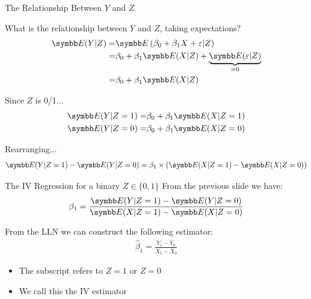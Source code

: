 \documentclass[aspectratio=169,11pt]{beamer}
\begin{document}
\begin{frame}{The Relationship Between $Y$ and $Z$}

What is the relationship between $Y$ and $Z$, taking expectations?
\begin{align*}
		\E(Y|Z) =& \E\left(\beta_0 + \beta_1 X + \varepsilon| Z\right)\\
			   =& \beta_0 + \beta_1 \E(X|Z) + \underbrace{\E(\varepsilon|Z)}_{=0}\\
			   =&\beta_0 + \beta_1 \E(X|Z)
\end{align*}

Since $Z$ is 0/1... 
\begin{align*}
	\E(Y|Z=1) =& \beta_0 + \beta_1 \E(X|Z=1)\\
	\E(Y|Z=0) =& \beta_0 + \beta_1 \E(X|Z=0)
\end{align*}

Rearranging... 
\begin{align*}
	\E(Y|Z=1)-\E(Y|Z=0) = \beta_1\times\left(\E(X|Z=1)-\E(X|Z=0)\right)
\end{align*}
\end{frame}

\begin{frame}{The IV Regression for a binary $Z \in\{0,1\}$}
From the previous slide we have:
\begin{align*}
	\beta_1 = \frac{\E(Y|Z=1)-\E(Y|Z=0)}{\E(X|Z=1)-\E(X|Z=0)}
\end{align*}


From the LLN we can construct the following estimator:
\begin{align*}
	\hat\beta_1 = \frac{\bar Y_1 - \bar Y_0}{\bar X_1 - \bar X_0}
\end{align*}
\begin{itemize}
	\item The subscript refers to $Z=1$ or $Z=0$
	\item We call this the IV estimator
\end{itemize}
\end{frame}
\end{document}
